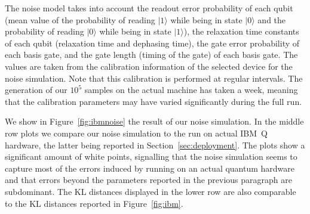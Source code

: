 \documentclass[twocolumn,preprintnumbers,superscriptaddress]{revtex4-2}
\begin{document}
The noise model takes into account the readout error probability of each qubit (mean value of the probability
of reading $|1\rangle$ while being in state $|0\rangle$ and the probability of reading $|0\rangle$ while being in
state $|1\rangle$), the relaxation time constants of each qubit (relaxation time and dephasing time), the gate error probability
of each basis gate, and the gate length (timing of the gate) of each basis gate. The values are taken from the calibration information
of the selected device for the noise simulation. Note that this calibration is performed at regular intervals. The generation of our
$10^5$ samples on the actual machine has taken a week, meaning that the calibration parameters may have varied significantly
during the full run.

We show in Figure~\ref{fig:ibmnoise} the result of our noise simulation. In the middle row plots we compare our noise simulation
to the run on actual IBM~Q hardware, the latter being reported in Section~\ref{sec:deployment}. The plots show a significant amount
of white points, signalling that the noise simulation seems to capture most of the errors induced by running on an actual quantum
hardware and that errors beyond the parameters reported in the previous paragraph are subdominant. The KL distances displayed in
the lower row are also comparable to the KL distances reported in Figure~\ref{fig:ibm}. 
\end{document}
